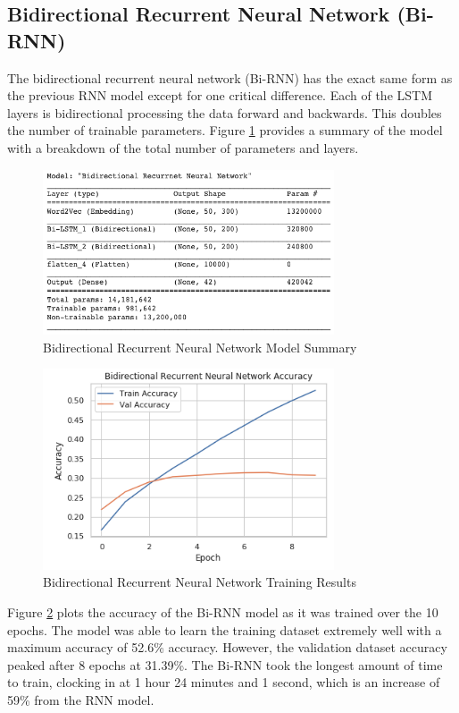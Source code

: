 \documentclass[5p,authoryear]{elsarticle}
\begin{document}
\subsection{Bidirectional Recurrent Neural Network (Bi-RNN)}


The bidirectional recurrent neural network (Bi-RNN) has the exact same form as the previous RNN model except for one critical difference. Each of the LSTM layers is bidirectional processing the data forward and backwards. This doubles the number of trainable parameters. Figure \ref{BiRNN Summary} provides a summary of the model with a breakdown of the total number of parameters and layers.


\begin{figure}[!htb] \centering
	\includegraphics[width=3.4in]{figures/Bi-RNN_Model.png}
	\caption[]{Bidirectional Recurrent Neural Network Model Summary} 
	\label{BiRNN Summary} 
\end{figure}


\begin{figure}[!htb] \centering
	\includegraphics[width=3.4in]{figures/Bi-RNN_Accuracy.png}
	\caption[]{Bidirectional Recurrent Neural Network Training Results} 
	\label{BiRNN Results} 
\end{figure}


Figure \ref{BiRNN Results} plots the accuracy of the Bi-RNN model as it was trained over the 10 epochs. The model was able to learn the training dataset extremely well with a maximum accuracy of 52.6\% accuracy. However, the validation dataset accuracy peaked after 8 epochs at 31.39\%. The Bi-RNN took the longest amount of time to train, clocking in at 1 hour 24 minutes and 1 second, which is an increase of 59\% from the RNN model. 
\end{document}
